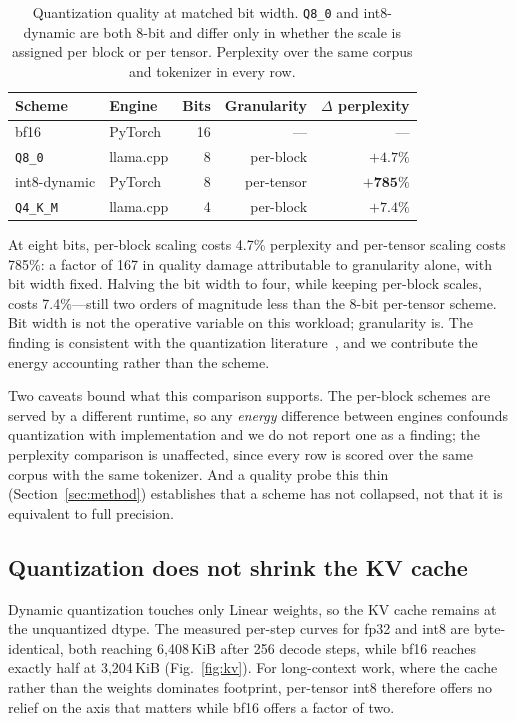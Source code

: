 \documentclass[journal]{IEEEtran}
\begin{document}
\begin{table}[t]
\centering
\caption{Quantization quality at matched bit width. \texttt{Q8\_0} and
int8-dynamic are both 8-bit and differ only in whether the scale is assigned
per block or per tensor. Perplexity over the same corpus and tokenizer in every
row.}
\label{tab:granularity}
\begin{tabular}{llrrr}
\toprule
Scheme & Engine & Bits & Granularity & $\Delta$ perplexity \\
\midrule
bf16         & PyTorch   & 16 & ---         & --- \\
\texttt{Q8\_0}   & llama.cpp & 8  & per-block   & $+4.7\%$ \\
int8-dynamic & PyTorch   & 8  & per-tensor  & $\mathbf{+785\%}$ \\
\texttt{Q4\_K\_M} & llama.cpp & 4  & per-block   & $+7.4\%$ \\
\bottomrule
\end{tabular}
\end{table}

At eight bits, per-block scaling costs 4.7\% perplexity and per-tensor scaling
costs 785\%: a factor of 167 in quality damage attributable to granularity
alone, with bit width fixed. Halving the bit width to four, while keeping
per-block scales, costs 7.4\%---still two orders of magnitude less than the
8-bit per-tensor scheme. Bit width is not the operative variable on this
workload; granularity is. The finding is consistent with the quantization
literature~\cite{dettmers2022llmint8,frantar2023gptq,lin2024awq,
xiao2023smoothquant,gholami2022quantsurvey}, and we contribute the energy
accounting rather than the scheme.

Two caveats bound what this comparison supports. The per-block schemes are
served by a different runtime, so any \emph{energy} difference between engines
confounds quantization with implementation and we do not report one as a
finding; the perplexity comparison is unaffected, since every row is scored
over the same corpus with the same tokenizer. And a quality probe this thin
(Section~\ref{sec:method}) establishes that a scheme has not collapsed, not
that it is equivalent to full precision.

\subsection{Quantization does not shrink the KV cache}
Dynamic quantization touches only Linear weights, so the KV cache remains at
the unquantized dtype. The measured per-step curves for fp32 and int8 are
byte-identical, both reaching 6{,}408\,KiB after 256 decode steps, while bf16
reaches exactly half at 3{,}204\,KiB (Fig.~\ref{fig:kv}). For long-context work, where
the cache rather than the weights dominates footprint, per-tensor int8
therefore offers no relief on the axis that matters while bf16 offers a factor
of two.
\end{document}
